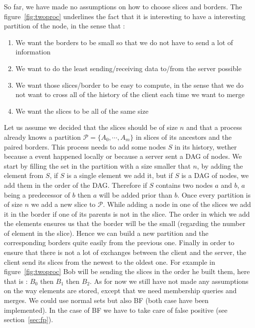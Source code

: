 So far, we have made no assumptions on how to choose slices and borders. The figure~\ref{fig:twoproc} underlines the fact that it is interesting to have a interesting partition of the node, in the sense that :
\begin{enumerate}
 \item We want the borders to be small so that we do not have to send a lot of information
 \item We want to do the least sending/receiving data to/from the server possible
 \item We want those slices/border to be easy to compute, in the sense that we do not want to cross all of the history of the client each time we want to merge
 \item We want the slices to be all of the same size
\end{enumerate}
Let us assume we decided that the slices should be of size $n$ and that a process already knows a partition $\mathcal{P} = \{A_0,\cdots,A_m\}$ in slices of its ancestors and the paired borders. This process needs to add some nodes $S$ in its history, wether because a event happened locally or because a server sent a DAG of nodes. We start by filling the set in the partition with a size smaller that $n$, by adding the element from $S$, if $S$ is a single element we add it, but if $S$ is a DAG of nodes, we add them in the order of the DAG. Therefore if $S$ contains two nodes $a$ and $b$, $a$ being a predecessor of $b$ then $a$ will be added prior than $b$. Once every partition is of size $n$ we add a new slice to $\mathcal P$. While adding a node in one of the slices we add it in the border if one of its parents is not in the slice. The order in which we add the elements ensures us that the border will be the small (regarding the number of element in the slice). Hence we can build a new partition and the 
corresponding borders quite easily from the previous one. Finally in order to ensure that there is not a lot of exchanges between the client and the 
server, the client send its slices from the newest to the oldest one. For example in figure~\ref{fig:twoproc} Bob will be sending the slices in the order he built them, here that is : $B_0$ then $B_1$ then $B_2$.
As for now we still have not made any assumptions on the way elements are stored, except that we need membership queries and merges. We could use normal sets but also BF (both case have been implemented). In the case of BF we have to take care of false positive (see section~\ref{sec:fp}).
